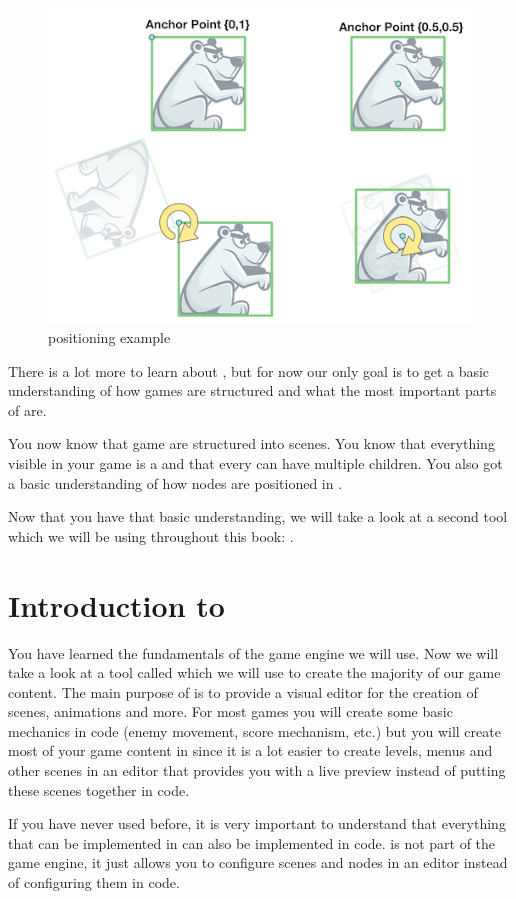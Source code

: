 \begin{figure}[H]
		\centering
		\includegraphics[width=0.6\linewidth]{images/cocos2d/ccnode/Rotation.png}     
		\caption{\ccnode{} positioning example}
\end{figure}

There is a lot more to learn about \ccnode{}, but for now our only goal is to
get a basic understanding of how \cocos{} games are structured and what the most
important parts of \cocos{} are.

You now know that \cocos{} game are structured into scenes. You know that
everything visible in your game is a \ccnode{} and that every \ccnode{} can have
multiple children. You also got a basic understanding of how nodes are
positioned in \cocos{}.

Now that you have that basic understanding, we will take a look at a second tool which we will be using throughout this book: \SB{}.

\section{Introduction to \SB{}}
You have learned the fundamentals of the game engine we will use. Now we will
take a look at a tool called \SB{} which we will use to create the majority of
our game content. The main purpose of \SB{} is to provide a visual editor for
the creation of scenes, animations and more. For most games you will create some
basic mechanics in code (enemy movement, score mechanism, etc.) but you will create
 most of your game content in \SB{} since it is a lot easier to create
levels, menus and other scenes in an editor that provides you with a live
preview instead of putting these scenes together in code.

If you have never used \SB{} before, it is very important to understand that
everything that can be implemented in \SB{} can also be implemented in code.
\SB{} is not part of the game engine, it just allows you to configure \cocos{}
scenes and nodes in an editor instead of configuring them in code.

